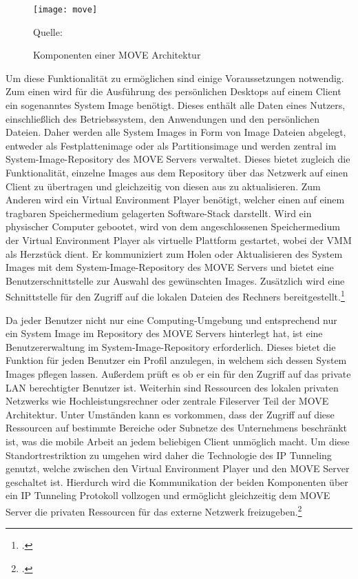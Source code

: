 \begin{figure}[H]
\begin{center}
\texttt{[image: move]}
\caption{Komponenten einer MOVE Architektur}
Quelle: \cite[Seite 891]{MOVE}
\end{center}
\end{figure}
\vspace{-1cm}

Um diese Funktionalität zu ermöglichen sind einige Voraussetzungen notwendig. Zum einen wird für die Ausführung des persönlichen Desktops auf einem Client ein sogenanntes System Image benötigt. Dieses enthält alle Daten eines Nutzers, einschließlich des Betriebssystem, den Anwendungen und den persönlichen Dateien.
Daher werden alle System Images in Form von Image Dateien abgelegt, entweder als 
Festplattenimage oder als Partitionsimage und werden zentral im System-Image-Repository des MOVE Servers verwaltet. Dieses bietet zugleich die Funktionalität, einzelne Images aus dem Repository über das Netzwerk auf einen Client zu übertragen und gleichzeitig von diesen aus zu aktualisieren. Zum Anderen wird ein Virtual Environment Player benötigt, welcher einen auf einem tragbaren Speichermedium gelagerten Software-Stack darstellt. Wird ein physischer Computer gebootet, wird von dem angeschlossenen Speichermedium der Virtual Environment Player als virtuelle Plattform gestartet, wobei der VMM als Herzstück dient. Er kommuniziert zum Holen oder Aktualisieren des System Images mit dem System-Image-Repository des MOVE Servers und bietet eine Benutzerschnittstelle zur Auswahl des gewünschten Images. Zusätzlich wird eine Schnittstelle für den Zugriff auf die lokalen Dateien des Rechners bereitgestellt.\footcite[Vgl.][Seite 892]{MOVE}

Da jeder Benutzer nicht nur eine Computing-Umgebung und entsprechend nur ein System Image im Repository des MOVE Servers hinterlegt hat, ist eine Benutzererwaltung im System-Image-Repository erforderlich. Dieses bietet die Funktion für jeden Benutzer ein Profil anzulegen, in welchem sich dessen System Images pflegen lassen. Außerdem prüft es ob er ein für den Zugriff auf das private LAN berechtigter Benutzer ist. Weiterhin sind Ressourcen des lokalen privaten Netzwerks wie Hochleistungsrechner oder zentrale Fileserver Teil der MOVE Architektur. Unter Umständen kann es vorkommen, dass der Zugriff auf diese Ressourcen auf bestimmte Bereiche oder Subnetze des Unternehmens beschränkt ist, was die mobile Arbeit an jedem beliebigen Client unmöglich macht. Um diese Standortrestriktion zu umgehen wird daher die Technologie des IP Tunneling genutzt, welche zwischen den Virtual Environment Player und den MOVE Server geschaltet ist. Hierdurch wird die Kommunikation der beiden Komponenten über ein IP Tunneling Protokoll vollzogen und ermöglicht gleichzeitig dem MOVE Server die privaten Ressourcen für das externe Netzwerk freizugeben.\footcite[Vgl.][Seite 892]{MOVE}

